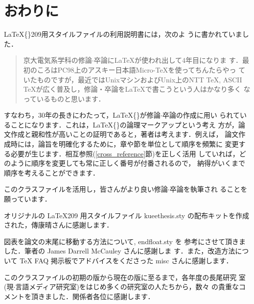\documentclass[
  sotsuron]{kuee}
\begin{document}
\hypertarget{ux304aux308fux308aux306b}{%
\chapter{おわりに}\label{ux304aux308fux308aux306b}}

\label{chap:conclusion}

\LaTeX\{\}209用スタイルファイルの利用説明書\cite{OldTebiki}には，次のよ
うに書かれていました．

\begin{quote}
  京大電気系学科の修論$\cdot$卒論に\LaTeX が使われ出して4年目になりま
  す．最初のころはPC98上のアスキー日本語Micro-\TeX を使ってちんたらやっ
  ていたものですが，最近ではUnixマシンおよびUnix上のNTT \TeX, ASCII
  \TeX が広く普及し，修論・卒論を\LaTeX で書こうという人はかなり多く
  なっているものと思います．
\end{quote}

すなわち，30年の長きにわたって，\LaTeX\{\}が修論\(\cdot\)卒論の作成に用い
られていることになります．これは，\LaTeX\{\}の論理マークアップという考え
方が，論文作成と親和性が高いことの証明であると，著者は考えます．例えば，
論文作成時には，論旨を明確化するために，章や節を単位として順序を頻繁に
変更する必要が生じます．相互参照(\ref{cross_reference}節)を正しく活用
していれば，どのように順序を変更しても常に正しく番号が付番されるので，
納得がいくまで順序を考えることができます．

このクラスファイルを活用し，皆さんがより良い修論\(\cdot\)卒論を執筆され
ることを願っています．

\begin{acknowledgements}
  オリジナルの \LaTeX{}209 用スタイルファイル {\ttfamily
  kueethesis.sty} の配布キットを作成された，傳康晴さんに感謝します．

  図表を論文の末尾に移動する方法について, {\ttfamily endfloat.sty} を
  参考にさせて頂きました．筆者の James Darrell McCauley さんに感謝しま
  す．また，改造方法について \TeX{} FAQ 掲示板でアドバイスをくださった
  misc さんに感謝します．

  このクラスファイルの初期の版から現在の版に至るまで，各年度の長尾研究
  室(現$\cdot$言語メディア研究室)をはじめ多くの研究室の人たちから，数々
  の貴重なコメントを頂きました．関係者各位に感謝します．
\end{acknowledgements}




\appendix
\end{document}
